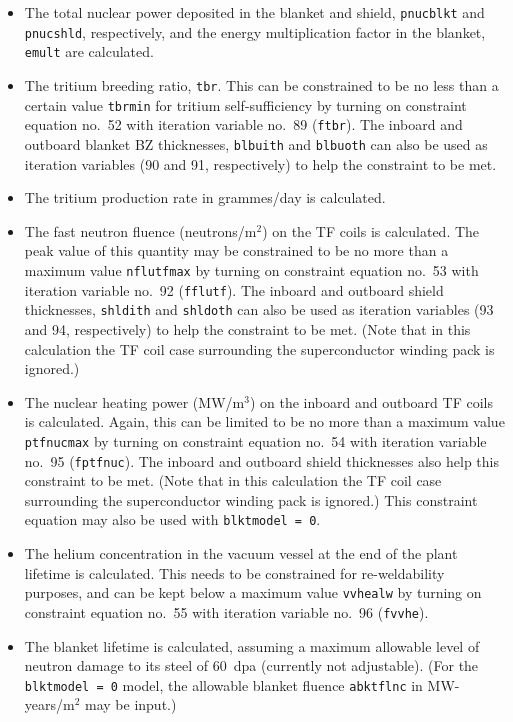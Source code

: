 \documentclass[11pt,a4paper]{report}
\begin{document}
\begin{itemize}

\item The total nuclear power deposited in the blanket and shield,
  \texttt{pnucblkt} and \texttt{pnucshld}, respectively, and the energy
  multiplication factor in the blanket, \texttt{emult} are calculated.

\item The tritium breeding ratio, \texttt{tbr}. This can be constrained to be
  no less than a certain value \texttt{tbrmin} for tritium self-sufficiency by
  turning on constraint equation no.\ 52 with iteration variable no.\ 89
  (\texttt{ftbr}). The inboard and outboard blanket BZ thicknesses,
  \texttt{blbuith} and \texttt{blbuoth} can also be used as iteration
  variables (90 and 91, respectively) to help the constraint to be met.

\item The tritium production rate in grammes/day is calculated.

\item The fast neutron fluence (neutrons/m$^2$) on the TF coils is
  calculated. The peak value of this quantity may be constrained to be no more
  than a maximum value \texttt{nflutfmax} by turning on constraint equation
  no.\ 53 with iteration variable no.\ 92 (\texttt{fflutf}). The inboard and
  outboard shield thicknesses, \texttt{shldith} and \texttt{shldoth} can also
  be used as iteration variables (93 and 94, respectively) to help the
  constraint to be met. (Note that in this calculation the TF coil case
  surrounding the superconductor winding pack is ignored.)

\item The nuclear heating power (MW/m$^3$) on the inboard and outboard TF
  coils is calculated. Again, this can be limited to be no more than a maximum
  value \texttt{ptfnucmax} by turning on constraint equation no.\ 54 with
  iteration variable no.\ 95 (\texttt{fptfnuc}). The inboard and outboard
  shield thicknesses also help this constraint to be met.  (Note that in this
  calculation the TF coil case surrounding the superconductor winding pack is
  ignored.) This constraint equation may also be used with \texttt{blktmodel =
    0}.

\item The helium concentration in the vacuum vessel at the end of the plant
  lifetime is calculated. This needs to be constrained for re-weldability
  purposes, and can be kept below a maximum value \texttt{vvhealw} by turning
  on constraint equation no.\ 55 with iteration variable no.\ 96
  (\texttt{fvvhe}).

\item The blanket lifetime is calculated, assuming a maximum allowable level
  of neutron damage to its steel of 60~dpa (currently not adjustable). (For
  the \texttt{blktmodel = 0} model, the allowable blanket fluence
  \texttt{abktflnc} in MW-years/m$^2$ may be input.)

\end{itemize}
\end{document}
